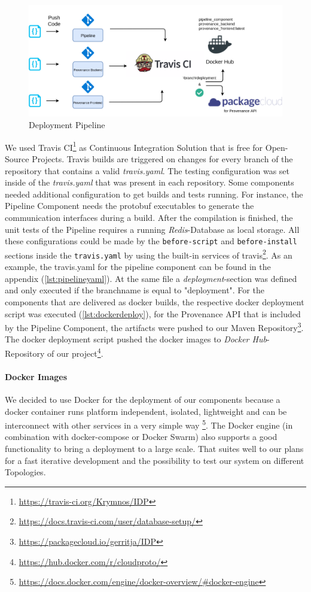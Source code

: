 \begin{figure}[h!]
	\includegraphics[width=\textwidth]{figures/deployment.png}
	\caption{Deployment Pipeline}
	\label{fig:deployment}
\end{figure}


We used Travis CI\footnote{\url{https://travis-ci.org/Krymnos/IDP}} as Continuous Integration Solution that is free for Open-Source Projects. Travis builds are triggered on changes for every branch of the repository that contains a valid \emph{travis.yaml}.
The testing configuration was set inside of the \emph{travis.yaml} that was present in each repository. Some components needed additional configuration to get builds and tests running. For instance, the Pipeline Component needs the protobuf executables to generate the communication interfaces during a build. After the compilation is finished, the unit tests of the Pipeline requires a running \emph{Redis}-Database as local storage. All these configurations could be made by the \texttt{before-script} and \texttt{before-install} sections inside the \texttt{travis.yaml} by using the built-in services of travis\footnote{\url{https://docs.travis-ci.com/user/database-setup/}}. As an example, the travis.yaml for the pipeline component can be found in the appendix (\ref{lst:pipelineyaml}).
At the same file a \emph{deployment}-section was defined and only executed if the branchname is equal to "deployment". For the components that are delivered as docker builds, the respective docker deployment script was executed (\ref{lst:dockerdeploy}), for the Provenance API that is included by the Pipeline Component, the artifacts were pushed to our Maven Repository\footnote{\url{https://packagecloud.io/gerritja/IDP}}. The docker deployment script pushed the docker images to \emph{Docker Hub}-Repository of our project\footnote{\url{https://hub.docker.com/r/cloudproto/}}.

\paragraph*{Docker Images}
We decided to use Docker for the deployment of our components because a docker container runs platform independent, isolated, lightweight and can be interconnect with other services in a very simple way \footnote{\url{https://docs.docker.com/engine/docker-overview/\#docker-engine}}. The Docker engine (in combination with docker-compose or Docker Swarm) also supports a good functionality to bring a deployment to a large scale. That suites well to our plans for a fast iterative development and the possibility to test our system on different Topologies.

